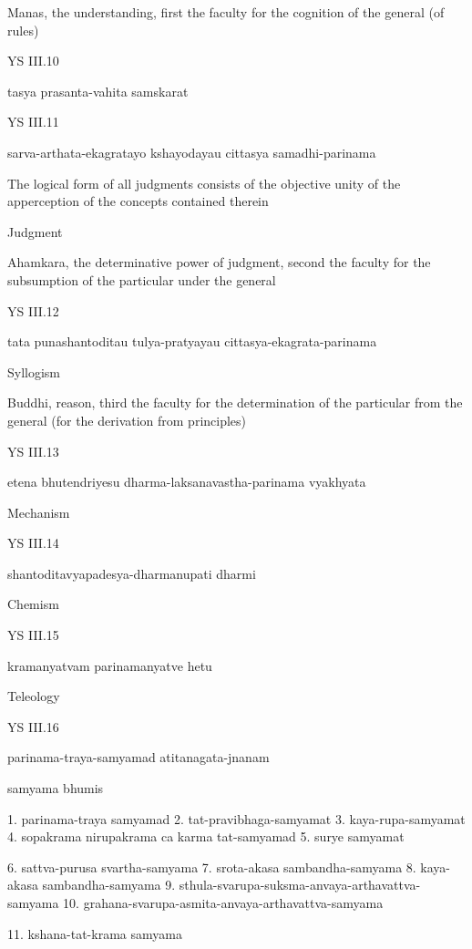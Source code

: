     Manas, the understanding, first the faculty for the cognition of the general (of rules)

YS III.10

    tasya prasanta-vahita samskarat

YS III.11

    sarva-arthata-ekagratayo kshayodayau cittasya samadhi-parinama

    The logical form of all judgments consists of the objective unity of the apperception of the concepts contained therein

    Judgment

    Ahamkara, the determinative power of judgment, second the faculty for the subsumption of the particular under the general

YS III.12

    tata punashantoditau tulya-pratyayau cittasya-ekagrata-parinama

    Syllogism

    Buddhi, reason, third the faculty for the determination of the particular from the general (for the derivation from principles)

YS III.13

    etena bhutendriyesu dharma-laksanavastha-parinama vyakhyata

    Mechanism

YS III.14

    shantoditavyapadesya-dharmanupati dharmi

    Chemism

YS III.15

    kramanyatvam parinamanyatve hetu

    Teleology

YS III.16

    parinama-traya-samyamad atitanagata-jnanam







samyama bhumis

1.  parinama-traya samyamad
2.  tat-pravibhaga-samyamat
3.  kaya-rupa-samyamat
4.  sopakrama nirupakrama ca karma tat-samyamad
5.  surye samyamat

6.  sattva-purusa svartha-samyama
7.  srota-akasa sambandha-samyama
8.  kaya-akasa sambandha-samyama
9.  sthula-svarupa-suksma-anvaya-arthavattva-samyama
10. grahana-svarupa-asmita-anvaya-arthavattva-samyama

11. kshana-tat-krama samyama